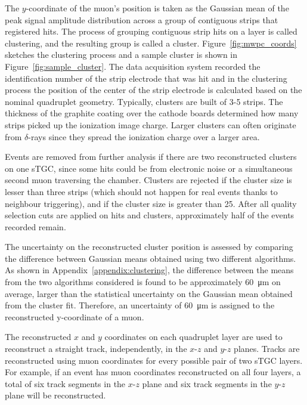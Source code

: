The $y$-coordinate of the muon's position is taken as the Gaussian mean of the peak signal amplitude distribution across a group of contiguous strips that registered hits. The process of grouping contiguous strip hits on a layer is called clustering, and the resulting group is called a cluster. Figure~\ref{fig:mwpc_coords} sketches the clustering process and a sample cluster is shown in Figure~\ref{fig:sample_cluster}. The data acquisition system recorded the identification number of the strip electrode that was hit and in the clustering process the position of the center of the strip electrode is calculated based on the nominal quadruplet geometry. Typically, clusters are built of 3-5 strips. The thickness of the graphite coating over the cathode boards determined how many strips picked up the ionization image charge. Larger clusters can often originate from $\delta$-rays since they spread the ionization charge over a larger area.

Events are removed from further analysis if there are two reconstructed clusters on one sTGC, since some hits could be from electronic noise or a simultaneous second muon traversing the chamber. Clusters are rejected if the cluster size is lesser than three strips (which should not happen for real events thanks to neighbour triggering), and if the cluster size is greater than 25. After all quality selection cuts are applied on hits and clusters, approximately half of the events recorded remain.

The uncertainty on the reconstructed cluster position is assessed by comparing the difference between Gaussian means obtained using two different algorithms. As shown in Appendix~\ref{appendix:clustering}, the difference between the means from the two algorithms considered is found to be approximately \SI{60}{\micro\meter} on average, larger than the statistical uncertainty on the Gaussian mean obtained from the cluster fit. Therefore, an uncertainty of \SI{60}{\micro\meter} is assigned to the reconstructed y-coordinate of a muon. 

The reconstructed $x$ and $y$ coordinates on each quadruplet layer are used to reconstruct a straight track, independently, in the $x$-$z$ and $y$-$z$ planes. Tracks are reconstructed using muon coordinates for every possible pair of two sTGC layers.  For example, if an event has muon coordinates reconstructed on all four layers, a total of six track segments in the $x$-$z$ plane and six track segments in the $y$-$z$ plane will be reconstructed. 


